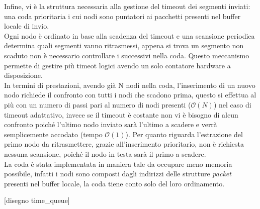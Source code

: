 Infine, vi è la struttura necessaria alla gestione del timeout dei segmenti
inviati: una coda prioritaria i cui nodi sono puntatori
ai pacchetti presenti nel buffer locale di invio.\\
Ogni nodo è ordinato in base alla scadenza del timeout e una scansione 
periodica determina quali segmenti vanno ritrasmessi, appena si trova un 
segmento non scaduto non è necessario controllare i successivi
nella coda.
Questo meccanismo permette di gestire più timeot logici avendo un solo 
contatore hardware a disposizione.\\
In termini di prestazioni, avendo già N nodi nella coda, 
l'inserimento di un nuovo nodo richiede il confronto con tutti i
nodi che scadono prima, questo si effettua al più con un numero di passi
pari al numero di nodi presenti ($\mathcal{O}(N)$)
nel caso di timeout adattativo, invece se il timeout è costante non vi è bisogno
di alcun confronto poiché l'ultimo nodo inviato sarà l'ultimo a scadere e 
verrà semplicemente accodato (tempo $\mathcal{O}(1)$).
Per quanto riguarda l'estrazione del primo nodo da ritrasmettere, grazie 
all'inserimento prioritario, non è richiesta nessuna scansione, poiché il nodo 
in testa sarà il primo a scadere.\\
La coda è stata implementata in maniera tale da occupare meno memoria possibile,
infatti i nodi sono composti dagli indirizzi delle strutture \emph{packet}
presenti nel buffer locale, la coda tiene conto solo del loro ordinamento.

[disegno time\_queue]

